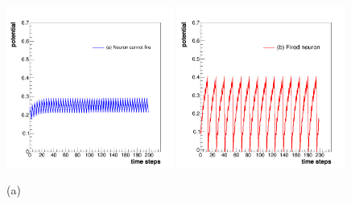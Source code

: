 \begin{figure}[thp]
\centering
\includegraphics[width=0.49\textwidth]{c_potential_time_sawtooth_a.png}
\includegraphics[width=0.49\textwidth]{c_potential_time_sawtooth_b.png}
\caption{(a) }
\label{fig:c_potential_time_sawtooth}
\end{figure}
